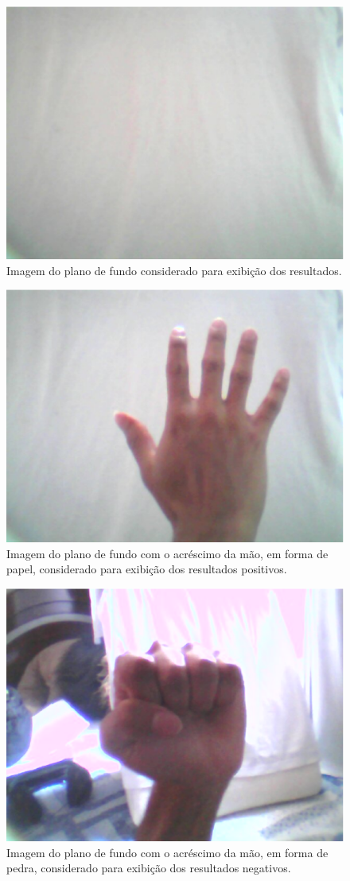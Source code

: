 \documentclass[conference]{Trabalho_Final}
\begin{document}
\begin{figure}[]
  \centering
  \includegraphics[width = 5 cm]{background}
  \caption{Imagem do plano de fundo considerado para exibi\c{c}\~ao dos resultados.}
  \label{fig:back}
\end{figure}

\begin{figure}[]
  \centering
  \includegraphics[width = 5 cm]{papel}
  \caption{Imagem do plano de fundo com o acr\'escimo da m\~ao, em forma de papel, considerado para exibi\c{c}\~ao dos resultados positivos.}
  \label{fig:mao}
\end{figure}

\begin{figure}[]
  \centering
  \includegraphics[width = 5 cm]{pedra}
  \caption{Imagem do plano de fundo com o acr\'escimo da m\~ao, em forma de pedra, considerado para exibi\c{c}\~ao dos resultados negativos.}
  \label{fig:pedra}
\end{figure}

\end{document}
